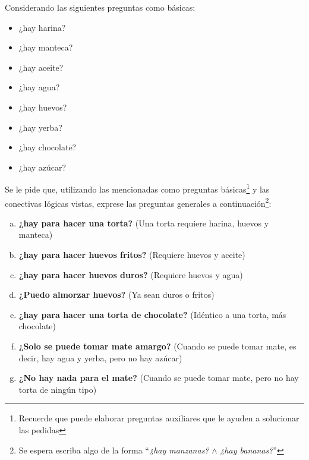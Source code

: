 \begin{exercise}
    Considerando las siguientes preguntas como básicas:

    \begin{minipage}{0.45\textwidth}
        \begin{itemize}
            \item ¿hay harina?
            \item ¿hay manteca?
            \item ¿hay aceite?
            \item ¿hay agua?
        \end{itemize}
    \end{minipage}
    \begin{minipage}{0.45\textwidth}
        \begin{itemize}
            \item ¿hay huevos?
            \item ¿hay yerba?
            \item ¿hay chocolate?
            \item ¿hay azúcar?
        \end{itemize}
    \end{minipage}

    Se le pide que, utilizando las mencionadas como preguntas básicas\footnote{
        Recuerde que puede elaborar preguntas auxiliares que le ayuden a
        solucionar las pedidas } y las conectivas lógicas vistas, exprese las
        preguntas generales a continuación\footnote{ Se espera escriba algo de
        la forma ``\textit{¿hay manzanas?} $\land$ \textit{¿hay bananas?}'' }:
    \begin{enumerate}[a)]
        \item \textbf{¿hay para hacer una torta?} (Una torta requiere harina,
        huevos y manteca)
        \item \textbf{¿hay para hacer huevos fritos?} (Requiere huevos y aceite)
        \item \textbf{¿hay para hacer huevos duros?} (Requiere huevos y agua)
        \item \textbf{¿Puedo almorzar huevos?} (Ya sean duros o fritos)
        \item \textbf{¿hay para hacer una torta de chocolate?} (Idéntico a una
        torta, más chocolate)
        \item \textbf{¿Solo se puede tomar mate amargo?} (Cuando se puede tomar
        mate, es decir, hay agua y yerba, pero no hay azúcar)
        \item \textbf{¿No hay nada para el mate?} (Cuando se puede tomar mate,
        pero no hay torta de ningún tipo)
    \end{enumerate}
\end{exercise}

